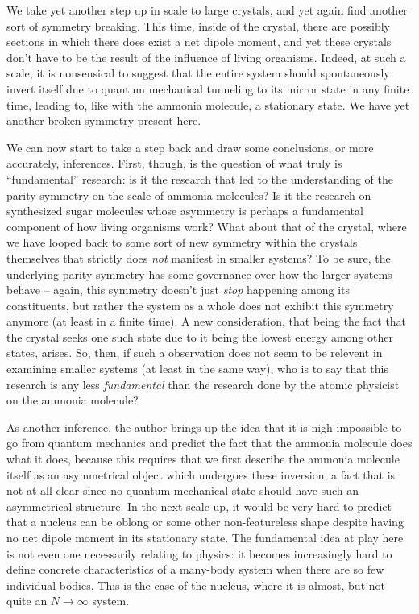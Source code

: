 We take yet another step up in scale to large crystals, and yet again find another sort of symmetry breaking. This time, inside of the crystal, there are possibly sections in which there does exist a net dipole moment, and yet these crystals don't have to be the result of the influence of living organisms. Indeed, at such a scale, it is nonsensical to suggest that the entire system should spontaneously invert itself due to quantum mechanical tunneling to its mirror state in any finite time, leading to, like with the ammonia molecule, a stationary state. We have yet another broken symmetry present here.

We can now start to take a step back and draw some conclusions, or more accurately, inferences. First, though, is the question of what truly is ``fundamental'' research: is it the research that led to the understanding of the parity symmetry on the scale of ammonia molecules? Is it the research on synthesized sugar molecules whose asymmetry is perhaps a fundamental component of how living organisms work? What about that of the crystal, where we have looped back to some sort of new symmetry within the crystals themselves that strictly does \textit{not} manifest in smaller systems? To be sure, the underlying parity symmetry has some governance over how the larger systems behave -- again, this symmetry doesn't just \textit{stop} happening among its constituents, but rather the system as a whole does not exhibit this symmetry anymore (at least in a finite time). A new consideration, that being the fact that the crystal seeks one such state due to it being the lowest energy among other states, arises. So, then, if such a observation does not seem to be relevent in examining smaller systems (at least in the same way), who is to say that this research is any less \textit{fundamental} than the research done by the atomic physicist on the ammonia molecule?

As another inference, the author brings up the idea that it is nigh impossible to go from quantum mechanics and predict the fact that the ammonia molecule does what it does, because this requires that we first describe the ammonia molecule itself as an asymmetrical object which undergoes these inversion, a fact that is not at all clear since no quantum mechanical state should have such an asymmetrical structure. In the next scale up, it would be very hard to predict that a nucleus can be oblong or some other non-featureless shape despite having no net dipole moment in its stationary state. The fundamental idea at play here is not even one necessarily relating to physics: it becomes increasingly hard to define concrete characteristics of a many-body system when there are so few individual bodies. This is the case of the nucleus, where it is almost, but not quite an $N \rightarrow \infty$ system.

